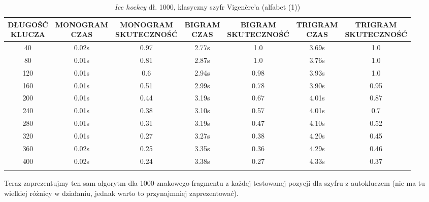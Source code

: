 \documentclass[a4paper]{article}
\theoremstyle{defn}
\theoremstyle{theorem}
\theoremstyle{lemma}
\theoremstyle{cor}
\theoremstyle{fact}
\begin{document}
\begin{center}\begin{small}\begin{longtable}{|c|c|c|c|c|c|c|}
\hline \makecell{DŁUGOŚĆ\\KLUCZA} &  \makecell{MONOGRAM\\CZAS} & \makecell{MONOGRAM\\SKUTECZNOŚĆ} & \makecell{BIGRAM\\CZAS} &  \makecell{BIGRAM\\SKUTECZNOŚĆ} & \makecell{TRIGRAM\\CZAS} & \makecell{TRIGRAM\\SKUTECZNOŚĆ}\\ \hline
40 & 0.02s & 0.97 & 2.77s & 1.0 & 3.69s & 1.0 \\ \hline
80 & 0.01s & 0.81 & 2.87s & 1.0 & 3.76s & 1.0 \\ \hline
120 & 0.01s & 0.6 & 2.94s & 0.98 & 3.93s & 1.0 \\ \hline
160 & 0.01s & 0.51 & 2.99s & 0.78 & 3.90s & 0.95 \\ \hline
200 & 0.01s & 0.44 & 3.19s & 0.67 & 4.01s & 0.87 \\ \hline
240 & 0.01s & 0.38 & 3.10s & 0.57 & 4.01s & 0.7 \\ \hline
280 & 0.01s & 0.31 & 3.19s & 0.47 & 4.10s & 0.52 \\ \hline
320 & 0.01s & 0.27 & 3.27s & 0.38 & 4.20s & 0.45 \\ \hline
360 & 0.02s & 0.25 & 3.35s & 0.36 & 4.29s & 0.46 \\ \hline
400 & 0.02s & 0.24 & 3.38s & 0.27 & 4.33s & 0.37 \\ \hline
\caption{\textit{Ice hockey} dł. 1000, klasyczny szyfr Vigenère'a (alfabet (1))}
\end{longtable}\end{small}\end{center}
Teraz zaprezentujmy ten sam algorytm dla 1000-znakowego fragmentu z każdej testowanej pozycji dla szyfru z autokluczem (nie ma tu wielkiej różnicy w działaniu, jednak warto to przynajmniej zaprezentować).\\\\
\end{document}
